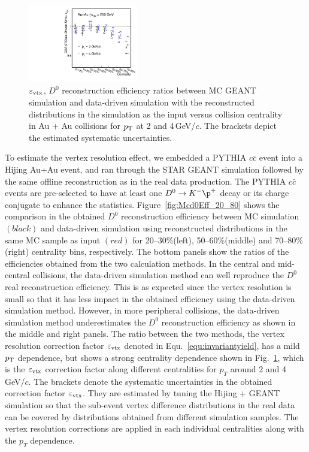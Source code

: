 \documentclass[%
 reprint,	
 amsmath,amssymb,
 aps,
 prc,
]{revtex4-1}
\begin{document}
\begin{figure}
\centering
\includegraphics[width=0.43\textwidth]{fig/Mcd0Eff_20_80_vsCent.pdf}
\caption{$\varepsilon_{\rm vtx}$, $D^0$ reconstruction efficiency ratios between MC GEANT simulation and data-driven simulation with the reconstructed distributions in the simulation as the input versus collision centrality in Au + Au collisions for $p_{\rm T}$ at 2 and 4\,GeV/$c$. The brackets depict the estimated systematic uncertainties.}
\label{fig:Mcd0Eff_20_80_vsCent} 
\end{figure}

To estimate the vertex resolution effect, we embedded a PYTHIA $c\bar{c}$ event into a Hijing Au+Au event, and ran through the STAR GEANT simulation followed by the same offline reconstruction as in the real data production. The PYTHIA $c\bar{c}$ events are pre-selected to have at least one $D^0\rightarrow K^-\p^+$ decay or its charge conjugate to enhance the statistics. Figure~\ref{fig:Mcd0Eff_20_80} shows the comparison in the obtained $D^0$ reconstruction efficiency between MC simulation $(black)$ and data-driven simulation using reconstructed distributions in the same MC sample as input $(red)$ for 20--30\%(left), 50--60\%(middle) and 70--80\%(right) centrality bins, respectively. The bottom panels show the ratios of the efficiencies obtained from the two calculation methods. In the central and mid-central collisions, the data-driven simulation method can well reproduce the $D^0$ real reconstruction efficiency. This is as expected since the vertex resolution is small so that it has less impact in the obtained efficiency using the data-driven simulation method. However, in more peripheral collisions, the data-driven simulation method underestimates the $D^0$ reconstruction efficiency as shown in the middle and right panels. The ratio between the two methods, the vertex resolution correction factor $\varepsilon_{\rm vtx}$ denoted in Equ.~\ref{equ:invariantyield}, has a mild $p_{\rm T}$ dependence, but shows a strong centrality dependence shown in Fig.~\ref{fig:Mcd0Eff_20_80_vsCent}, which is the $\varepsilon_{\rm vtx}$ correction factor along different centralities for $p_T$ around 2 and 4 GeV/$c$. The brackets denote the systematic uncertainties in the obtained correction factor $\varepsilon_{\rm vtx}$. They are estimated by tuning the Hijing + GEANT simulation so that the sub-event vertex difference distributions in the real data can be covered by distributions obtained from different simulation samples. The vertex resolution corrections are applied in each individual centralities along with the $p_T$ dependence.
\end{document}
